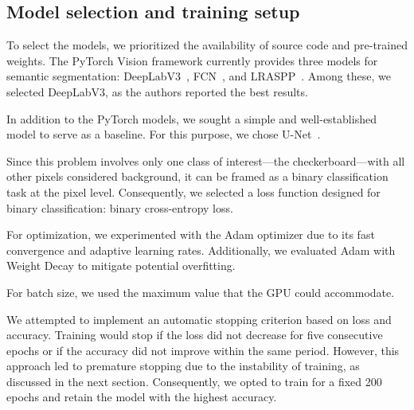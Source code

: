 \subsection{Model selection and training setup}
\label{sec:model_selection}
To select the models, we prioritized the availability of source code and 
pre-trained weights. The PyTorch Vision framework currently provides three 
models for semantic segmentation: DeepLabV3~\cite{DeepLabV3}, FCN~\cite{fcn}, 
and LRASPP~\cite{LRASPP}. Among these, we selected DeepLabV3, as the authors 
reported the best results.

In addition to the PyTorch models, we sought a simple and well-established model 
to serve as a baseline. For this purpose, we chose U-Net~\cite{unet}.

Since this problem involves only one class of interest—the checkerboard—with all 
other pixels considered background, it can be framed as a binary classification 
task at the pixel level. Consequently, we selected a loss function designed for 
binary classification: binary cross-entropy loss.

For optimization, we experimented with the Adam optimizer due to its fast 
convergence and adaptive learning rates. Additionally, we evaluated Adam with 
Weight Decay to mitigate potential overfitting.

For batch size, we used the maximum value that the GPU could accommodate.

We attempted to implement an automatic stopping criterion based on loss and 
accuracy. Training would stop if the loss did not decrease for five consecutive 
epochs or if the accuracy did not improve within the same period. However, this 
approach led to premature stopping due to the instability of training, as 
discussed in the next section. Consequently, we opted to train for a fixed 200 
epochs and retain the model with the highest accuracy.